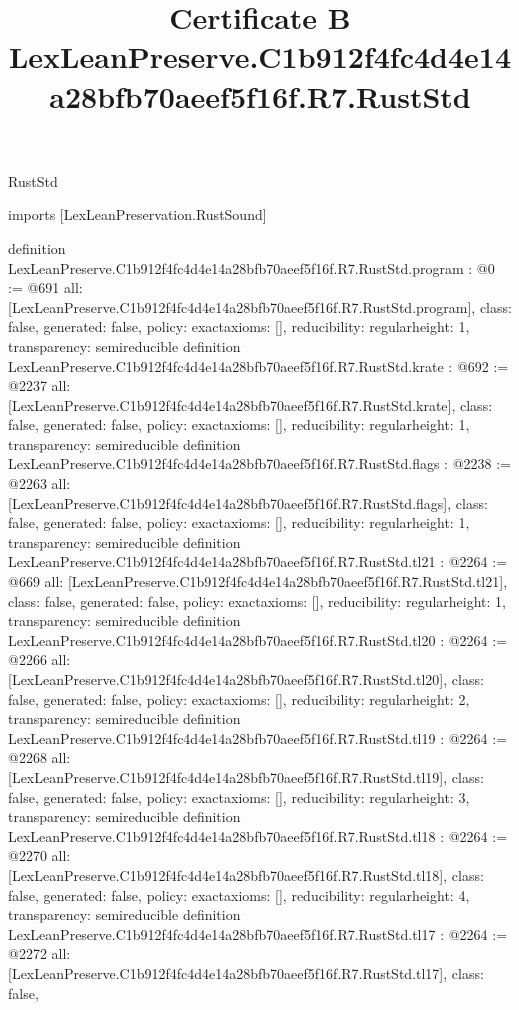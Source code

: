 \begin{lexlean}{RustStd}
\title{Certificate B LexLeanPreserve.C1b912f4fc4d4e14a28bfb70aeef5f16f.R7.RustStd}
\begin{coremodule}
imports [LexLeanPreservation.RustSound]

definition LexLeanPreserve.C1b912f4fc4d4e14a28bfb70aeef5f16f.R7.RustStd.program : @0 := @691 {
  all: [LexLeanPreserve.C1b912f4fc4d4e14a28bfb70aeef5f16f.R7.RustStd.program],
  class: false,
  generated: false,
  policy: exact{axioms: []},
  reducibility: regular{height: 1},
  transparency: semireducible
}
definition LexLeanPreserve.C1b912f4fc4d4e14a28bfb70aeef5f16f.R7.RustStd.krate : @692 := @2237 {
  all: [LexLeanPreserve.C1b912f4fc4d4e14a28bfb70aeef5f16f.R7.RustStd.krate],
  class: false,
  generated: false,
  policy: exact{axioms: []},
  reducibility: regular{height: 1},
  transparency: semireducible
}
definition LexLeanPreserve.C1b912f4fc4d4e14a28bfb70aeef5f16f.R7.RustStd.flags : @2238 := @2263 {
  all: [LexLeanPreserve.C1b912f4fc4d4e14a28bfb70aeef5f16f.R7.RustStd.flags],
  class: false,
  generated: false,
  policy: exact{axioms: []},
  reducibility: regular{height: 1},
  transparency: semireducible
}
definition LexLeanPreserve.C1b912f4fc4d4e14a28bfb70aeef5f16f.R7.RustStd.tl21 : @2264 := @669 {
  all: [LexLeanPreserve.C1b912f4fc4d4e14a28bfb70aeef5f16f.R7.RustStd.tl21],
  class: false,
  generated: false,
  policy: exact{axioms: []},
  reducibility: regular{height: 1},
  transparency: semireducible
}
definition LexLeanPreserve.C1b912f4fc4d4e14a28bfb70aeef5f16f.R7.RustStd.tl20 : @2264 := @2266 {
  all: [LexLeanPreserve.C1b912f4fc4d4e14a28bfb70aeef5f16f.R7.RustStd.tl20],
  class: false,
  generated: false,
  policy: exact{axioms: []},
  reducibility: regular{height: 2},
  transparency: semireducible
}
definition LexLeanPreserve.C1b912f4fc4d4e14a28bfb70aeef5f16f.R7.RustStd.tl19 : @2264 := @2268 {
  all: [LexLeanPreserve.C1b912f4fc4d4e14a28bfb70aeef5f16f.R7.RustStd.tl19],
  class: false,
  generated: false,
  policy: exact{axioms: []},
  reducibility: regular{height: 3},
  transparency: semireducible
}
definition LexLeanPreserve.C1b912f4fc4d4e14a28bfb70aeef5f16f.R7.RustStd.tl18 : @2264 := @2270 {
  all: [LexLeanPreserve.C1b912f4fc4d4e14a28bfb70aeef5f16f.R7.RustStd.tl18],
  class: false,
  generated: false,
  policy: exact{axioms: []},
  reducibility: regular{height: 4},
  transparency: semireducible
}
definition LexLeanPreserve.C1b912f4fc4d4e14a28bfb70aeef5f16f.R7.RustStd.tl17 : @2264 := @2272 {
  all: [LexLeanPreserve.C1b912f4fc4d4e14a28bfb70aeef5f16f.R7.RustStd.tl17],
  class: false,
}
\end{coremodule}
\end{lexlean}

